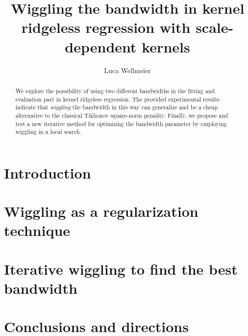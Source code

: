 \documentclass[12pt]{amsart}
\title{Wiggling the bandwidth in kernel ridgeless regression 
    with scale-dependent kernels}
\author{Luca Wellmeier}
\begin{document}
\begin{abstract}
    We explore the possibility of using two different bandwidths in the 
    fitting and evaluation part in kernel ridgeless regression.
    The provided experimental results indicate that \textit{wiggling}
    the bandwidth in this way can generalize and be a cheap alternative to
    the classical Tikhonov square-norm penality.
    Finally, we propose and test a new iterative method for optimizing the 
    bandwidth parameter by employing wiggling in a local search.
\end{abstract}
\maketitle
\tableofcontents

\section{Introduction}

\section{Wiggling as a regularization technique}

\section{Iterative wiggling to find the best bandwidth}

\section{Conclusions and directions}
\end{document}
